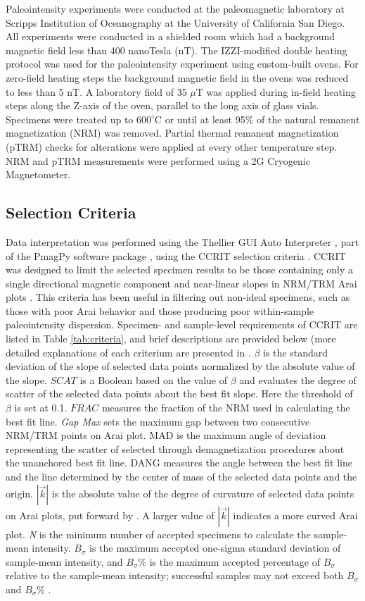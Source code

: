 \documentclass[draft]{agujournal2019}
\begin{document}
Paleointensity experiments were conducted at the paleomagnetic laboratory at Scripps Institution of Oceanography at the University of California San Diego. All experiments were conducted in a shielded room which had a background magnetic field less than 400 nanoTesla (nT). The IZZI-modified double heating protocol was used for the paleointensity experiment \cite{Yu2004a} using custom-built ovens. For zero-field heating steps the background magnetic field in the ovens was reduced to less than 5 nT. A laboratory field of 35 $\mu$T was applied during in-field heating steps along the Z-axis of the oven, parallel to the long axis of glass vials.  Specimens were treated up to $600^{\circ}$C or until at least 95\% of the natural remanent magnetization (NRM) was removed. Partial thermal remanent magnetization (pTRM) checks for alterations were applied at every other temperature step. NRM and pTRM measurements were performed using a 2G Cryogenic Magnetometer.

\subsection{Selection Criteria}
Data interpretation was performed using the Thellier GUI Auto Interpreter \cite{Shaar2013a}, part of the PmagPy software package \cite{Tauxe2016a}, using the CCRIT  selection criteria \cite{Cromwell2015b}. CCRIT was designed to limit the selected specimen results to be those containing only a single directional magnetic component and near-linear slopes in NRM/TRM Arai plots \cite{Arai1963a}. This criteria has been useful in filtering out non-ideal specimens, such as those with poor Arai behavior and those producing poor within-sample paleointensity dispersion. Specimen- and sample-level requirements of CCRIT are listed in Table \ref{tab:criteria}, and brief descriptions are provided below (more detailed explanations of each criterium are presented in . $\beta$ is the standard deviation of the slope of selected data points normalized by the absolute value of the slope. $SCAT$ is a Boolean based on the value of $\beta$ and evaluates the degree of scatter of the selected data points about the best fit slope. Here the threshold of $\beta$ is set at 0.1. $FRAC$ measures the fraction of the NRM used in calculating the best fit line. \textit{Gap Max} sets the maximum gap between two consecutive NRM/TRM points on Arai plot. MAD is the maximum angle of deviation representing the scatter of selected through demagnetization procedures about the unanchored best fit line. DANG measures the angle between the best fit line and the line determined by the center of mass of the selected data points and the origin. $|\vec{k}|$ is the absolute value of the degree of curvature of selected data points on Arai plots, put forward by . A larger value of $|\vec{k}|$ indicates a more curved Arai plot. \textit{N} is the minimum number of accepted specimens to calculate the sample-mean intensity. $B_{\sigma}$ is the maximum accepted one-sigma standard deviation of sample-mean intensity, and $B_{\sigma} \%$ is the maximum accepted percentage of $B_{\sigma}$ relative to the sample-mean intensity; successful samples may not exceed both $B_{\sigma}$ and $B_{\sigma} \%$ .
\end{document}

